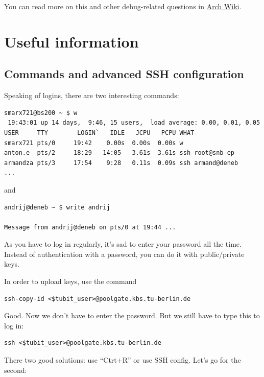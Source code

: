 \documentclass[]{report}
\begin{document}
You can read more on this and other debug-related questions in
\href{https://wiki.archlinux.org/index.php/Boot_debugging}{Arch Wiki}.

\section{Useful information}\label{useful-information}

\subsection{Commands and advanced SSH
configuration}\label{commands-and-advanced-ssh-configuration}

Speaking of logins, there are two interesting commands:

\begin{lstlisting}[style=simple]
smarx721@bs200 ~ $ w
 19:43:01 up 14 days,  9:46, 15 users,  load average: 0.00, 0.01, 0.05
USER     TTY        LOGIN`   IDLE   JCPU   PCPU WHAT
smarx721 pts/0     19:42    0.00s  0.00s  0.00s w
anton.e  pts/2     18:29   14:05   3.61s  3.61s ssh root@snb-ep
armandza pts/3     17:54    9:28   0.11s  0.09s ssh armand@deneb
...
\end{lstlisting}

and

\begin{lstlisting}[style=simple]
andrij@deneb ~ $ write andrij

Message from andrij@deneb on pts/0 at 19:44 ...
\end{lstlisting}

As you have to log in regularly, it's sad to enter your password all the
time. Instead of authentication with a password, you can do it with
public/private keys.

In order to upload keys, use the command

\begin{lstlisting}[style=simple]
ssh-copy-id <$tubit_user>@poolgate.kbs.tu-berlin.de
\end{lstlisting}

Good. Now we don't have to enter the password. But we still have to type
this to log in:

\begin{lstlisting}[style=simple]
ssh <$tubit_user>@poolgate.kbs.tu-berlin.de
\end{lstlisting}

There two good solutions: use ``Ctrt+R'' or use SSH config. Let's go for
the second:
\end{document}
